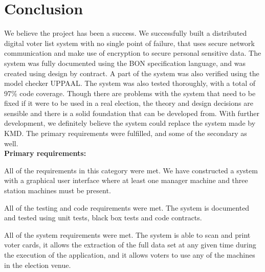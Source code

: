 \documentclass[a4paper]{report}
\begin{document}
\chapter{Conclusion}
We believe the project has been a success. We successfully built a distributed digital voter list system with no single point of failure, that uses secure network communication and make use of encryption to secure personal sensitive data. The system was fully documented using the BON specification language, and was created using design by contract. A part of the system was also verified using the model checker UPPAAL. The system was also tested thoroughly, with a total of 97\% code coverage.
Though there are problems with the system that need to be fixed if it were to be used in a real election, the theory and design decisions are sensible and there is a solid foundation that can be developed from. With further development, we definitely believe the system could replace the system made by KMD. The primary requirements were fulfilled, and some of the secondary as well.\\

\bf Primary requirements: \rm
\begin{description}[style=nextline]

\item[Features] All of the requirements in this category were met. We have constructed a system with a graphical user interface where at least one manager machine and three station machines must be present.

\item[Code requirements] All of the testing and code requirements were met. The system is documented and tested using unit tests, black box tests and code contracts. 

\item[The system] All of the system requirements were met. The system is able to scan and print voter cards, it allows the extraction of the full data set at any given time during the execution of the application, and it allows voters to use any of the machines in the election venue.

\end{description}
\end{document}

